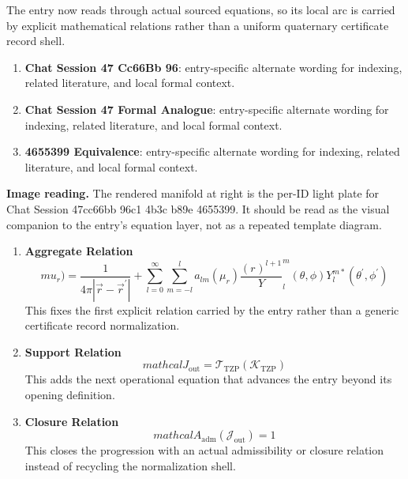 The entry now reads through actual sourced equations, so its local arc is carried by explicit mathematical relations rather than a uniform quaternary certificate record shell.
\endgroup

\begin{enumerate}[leftmargin=1.6em,itemsep=6pt,topsep=4pt]
\item \textbf{Chat Session 47 Cc66Bb 96}: entry-specific alternate wording for indexing, related literature, and local formal context.
\item \textbf{Chat Session 47 Formal Analogue}: entry-specific alternate wording for indexing, related literature, and local formal context.
\item \textbf{4655399 Equivalence}: entry-specific alternate wording for indexing, related literature, and local formal context.
\end{enumerate}

\begin{samepage}
\noindent\begin{minipage}[t]{0.45\linewidth}
\vspace{0pt}
\raggedright
\scriptsize\textbf{Image reading.} The rendered manifold at right is the per-ID light plate for Chat Session 47cc66bb 96c1 4b3c b89e 4655399. It should be read as the visual companion to the entry's equation layer, not as a repeated template diagram.\par
\end{minipage}\hfill
\begin{minipage}[t]{0.53\linewidth}
\vspace*{-0.10in}
\raggedright
{}
\end{minipage}
\end{samepage}

\clearpage


\begin{enumerate}[leftmargin=1.6em,itemsep=9pt,topsep=6pt]
\item \textbf{Aggregate Relation}
\[
mu_{r}) = \frac{1}{4\pi|\vec{r}-\vec{r}^{\prime}|} + \sum_{l=0}^{\infty}\sum_{m=-l}^{l}a_{lm}(\mu_{r})\frac{(r_{ })^{l+1}}Y_{l}^{m}(\theta,\phi)Y_{l}^{m*}(\theta^{\prime},\phi^{\prime})
\]
This fixes the first explicit relation carried by the entry rather than a generic certificate record normalization.

\item \textbf{Support Relation}
\[
mathcal{J}_{\mathrm{out}} = \mathcal{T}_{\mathrm{TZP}}\!\left(\mathcal{K}_{\mathrm{TZP}}\right)
\]
This adds the next operational equation that advances the entry beyond its opening definition.

\item \textbf{Closure Relation}
\[
mathcal{A}_{\mathrm{adm}}\!\left(\mathcal{J}_{\mathrm{out}}\right)=1
\]
This closes the progression with an actual admissibility or closure relation instead of recycling the normalization shell.
\end{enumerate}

